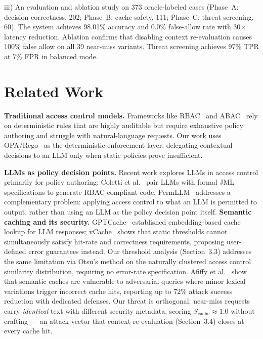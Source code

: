 \documentclass[runningheads]{llncs}
\begin{document}
iii) An evaluation and ablation study on 373 oracle-labeled cases (Phase~A: decision correctness, 202; Phase~B: cache safety, 111; Phase~C: threat screening, 60). The system achieves 98.01\% accuracy and 0.0\% false-allow rate with 30$\times$ latency reduction. Ablation confirms that disabling context re-evaluation causes 100\% false allow on all 39 near-miss variants. Threat screening achieves 97\% TPR at 7\% FPR in balanced mode.

\section{Related Work}

\noindent\textbf{Traditional access control models.} Frameworks like RBAC~\cite{sandhu1996rbac} and ABAC~\cite{xacml2013} rely on deterministic rules that are highly auditable but require exhaustive policy authoring and struggle with natural-language requests. Our work uses OPA/Rego~\cite{opa} as the deterministic enforcement layer, delegating contextual decisions to an LLM only when static policies prove insufficient.

\noindent\textbf{LLMs as policy decision points.} Recent work explores LLMs in access control primarily for policy authoring: Coletti et al.~\cite{coletti2024sacmat} pair LLMs with formal JML specifications to generate RBAC-compliant code. PermLLM~\cite{permllm2025} addresses a complementary problem: applying access control to what an LLM is permitted to output, rather than using an LLM as the policy decision point itself.
\noindent\textbf{Semantic caching and its security.} GPTCache~\cite{bang2023gptcache} established embedding-based cache lookup for LLM responses; vCache~\cite{schroeder2025vcache} shows that static thresholds cannot simultaneously satisfy hit-rate and correctness requirements, proposing user-defined error guarantees instead. Our threshold analysis (Section~3.3) addresses the same limitation via Otsu's method on the naturally clustered access control similarity distribution, requiring no error-rate specification. Afiffy et al.~\cite{safecache2026} show that semantic caches are vulnerable to adversarial queries where minor lexical variations trigger incorrect cache hits, reporting up to 72\% attack success reduction with dedicated defenses. Our threat is orthogonal: near-miss requests carry \emph{identical} text with different security metadata, scoring $S_{\text{cache}}\approx 1.0$ without crafting --- an attack vector that context re-evaluation (Section~3.4) closes at every cache hit.
\end{document}
